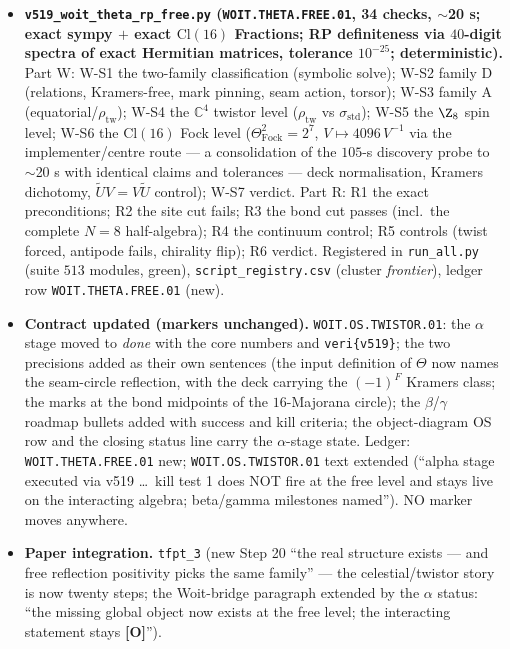 \documentclass[11pt]{article}
\providecommand{\mO}{\textbf{[O]}}\providecommand{\mX}{\textbf{[X]}}
\begin{document}
\begin{itemize}[leftmargin=1.5em]
\item \textbf{\texttt{v519\_woit\_theta\_rp\_free.py} (\texttt{WOIT.THETA.FREE.01}, 34 checks,
$\sim$20 s; exact sympy $+$ exact $\mathrm{Cl}(16)$ Fractions; RP definiteness via $40$-digit
spectra of exact Hermitian matrices, tolerance $10^{-25}$; deterministic).} Part W: W-S1 the
two-family classification (symbolic solve); W-S2 family D (relations, Kramers-free, mark
pinning, seam action, torsor); W-S3 family A (equatorial/$\rho_{\mathrm{tw}}$); W-S4 the $\mathbb{C}^4$
twistor level ($\rho_{\mathrm{tw}}$ vs $\sigma_{\mathrm{std}}$); W-S5 the $\Z_8$ spin level;
W-S6 the $\mathrm{Cl}(16)$ Fock level ($\Theta_{\mathrm{Fock}}^2=2^7$, $V\mapsto4096\,V^{-1}$
via the implementer/centre route --- a consolidation of the $105$-s discovery probe to
$\sim$20 s with identical claims and tolerances --- deck normalisation, Kramers dichotomy,
$\tilde U V=V\tilde U$ control); W-S7 verdict. Part R: R1 the exact preconditions; R2 the site
cut fails; R3 the bond cut passes (incl.\ the complete $N=8$ half-algebra); R4 the continuum
control; R5 controls (twist forced, antipode fails, chirality flip); R6 verdict. Registered in
\texttt{run\_all.py} (suite $513$ modules, green), \texttt{script\_registry.csv} (cluster
\emph{frontier}), ledger row \texttt{WOIT.THETA.FREE.01} (new).
\item \textbf{Contract updated (markers unchanged).} \texttt{WOIT.OS.TWISTOR.01}: the $\alpha$
stage moved to \emph{done} with the core numbers and \texttt{veri\{v519\}}; the two precisions
added as their own sentences (the input definition of $\Theta$ now names the seam-circle
reflection, with the deck carrying the $(-1)^F$ Kramers class; the marks at the bond midpoints
of the $16$-Majorana circle); the $\beta$/$\gamma$ roadmap bullets added with success and kill
criteria; the object-diagram OS row and the closing status line carry the $\alpha$-stage state.
Ledger: \texttt{WOIT.THETA.FREE.01} new; \texttt{WOIT.OS.TWISTOR.01} text extended (``alpha
stage executed via v519 \dots\ kill test 1 does NOT fire at the free level and stays live on
the interacting algebra; beta/gamma milestones named''). NO marker moves anywhere.
\item \textbf{Paper integration.} \texttt{tfpt\_3} (new Step 20 ``the real structure exists ---
and free reflection positivity picks the same family'' --- the celestial/twistor story is now
twenty steps; the Woit-bridge paragraph extended by the $\alpha$ status: ``the missing global
object now exists at the free level; the interacting statement stays \mO'').

\end{itemize}
\end{document}
